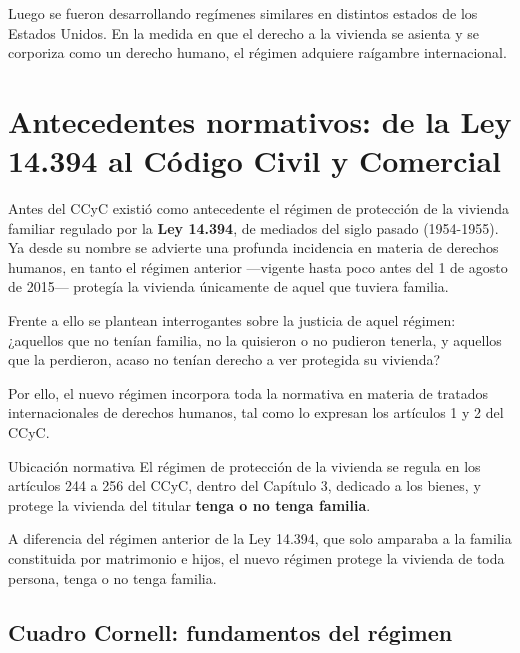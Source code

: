 \documentclass[12pt,oneside]{book}
\begin{document}
Luego se fueron desarrollando reg\'imenes similares en distintos estados de los Estados Unidos. En la medida en que el derecho a la vivienda se asienta y se corporiza como un derecho humano, el r\'egimen adquiere ra\'igambre internacional.

\section{Antecedentes normativos: de la Ley 14.394 al C\'odigo Civil y Comercial}

Antes del CCyC existi\'o como antecedente el r\'egimen de protecci\'on de la vivienda familiar regulado por la \textbf{Ley 14.394}, de mediados del siglo pasado (1954-1955). Ya desde su nombre se advierte una profunda incidencia en materia de derechos humanos, en tanto el r\'egimen anterior ---vigente hasta poco antes del 1 de agosto de 2015--- protegía la vivienda \'unicamente de aquel que tuviera familia.

Frente a ello se plantean interrogantes sobre la justicia de aquel r\'egimen: ¿aquellos que no tenían familia, no la quisieron o no pudieron tenerla, y aquellos que la perdieron, acaso no tenían derecho a ver protegida su vivienda?

Por ello, el nuevo r\'egimen incorpora toda la normativa en materia de tratados internacionales de derechos humanos, tal como lo expresan los art\'iculos 1 y 2 del CCyC.

\begin{definition}{Ubicaci\'on normativa}
El r\'egimen de protecci\'on de la vivienda se regula en los art\'iculos 244 a 256 del CCyC, dentro del Cap\'itulo 3, dedicado a los bienes, y protege la vivienda del titular \textbf{tenga o no tenga familia}.
\end{definition}

\begin{important}
A diferencia del r\'egimen anterior de la Ley 14.394, que solo amparaba a la familia constituida por matrimonio e hijos, el nuevo r\'egimen protege la vivienda de toda persona, tenga o no tenga familia.
\end{important}

\subsection*{Cuadro Cornell: fundamentos del r\'egimen}
\end{document}
